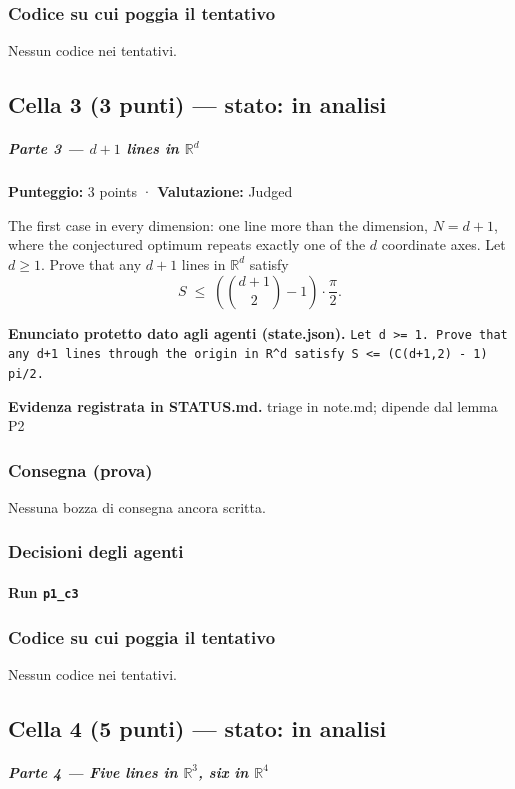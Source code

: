 \documentclass[11pt,a4paper]{article}
\begin{document}
\subsubsection{Codice su cui poggia il tentativo}
Nessun codice nei tentativi.

\subsection{Cella 3 (3 punti) — stato: in analisi}
\subparagraph{\texorpdfstring{Parte 3 --- \(d+1\) lines in
\(\mathbb{R}^d\)}{Parte 3 --- d+1 lines in \textbackslash mathbb\{R\}\^{}d}}\label{parte-3-d1-lines-in-mathbbrd}

\textbf{Punteggio:} 3 points · \textbf{Valutazione:} Judged

The first case in every dimension: one line more than the dimension,
\(N = d+1\), where the conjectured optimum repeats exactly one of the
\(d\) coordinate axes. Let \(d \ge 1\). Prove that any \(d+1\) lines in
\(\mathbb{R}^d\) satisfy \[
S \;\le\; \left( \binom{d+1}{2} - 1 \right) \cdot \frac{\pi}{2}.
\]

\textbf{Enunciato protetto dato agli agenti (state.json).} \texttt{Let d \textgreater{}= 1. Prove that any d+1 lines through the origin in R\textasciicircum{}d satisfy S \textless{}= (C(d+1,2) - 1) pi/2.}

\textbf{Evidenza registrata in STATUS.md.} triage in note.md; dipende dal lemma P2

\subsubsection{Consegna (prova)}
Nessuna bozza di consegna ancora scritta.

\subsubsection{Decisioni degli agenti}
\paragraph{Run \texttt{p1\_c3}}

\subsubsection{Codice su cui poggia il tentativo}
Nessun codice nei tentativi.

\subsection{Cella 4 (5 punti) — stato: in analisi}
\subparagraph{\texorpdfstring{Parte 4 --- Five lines in
\(\mathbb{R}^3\), six in
\(\mathbb{R}^4\)}{Parte 4 --- Five lines in \textbackslash mathbb\{R\}\^{}3, six in \textbackslash mathbb\{R\}\^{}4}}\label{parte-4-five-lines-in-mathbbr3-six-in-mathbbr4}
\end{document}
